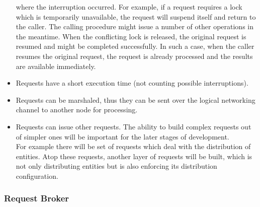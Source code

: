 \documentclass[a4paper, 10pt]{book}
\begin{document}
\begin{itemize}
                                        where the interruption occurred.
                                        For example, if a request requires a lock which is temporarily
                                        unavailable, the request will suspend itself and return to the
                                        caller. The calling procedure might issue a number of other
                                        operations in the meantime. When the conflicting lock is released,
                                        the original request is resumed and might be completed
                                        successfully. 
                                        In such a case, when the caller resumes the original request, the
                                        request is already processed and the results are available
                                        immediately. 
                                    \item Requests have a short execution time (not counting possible
                                        interruptions). 
                                    \item Requests can be marshaled, thus they can be sent over the
                                        logical networking channel to another node for processing. 
                                    \item Requests can issue other requests. The ability to build complex
                                        requests out of simpler ones will be important for the later stages
                                        of development.\\
                                        For example there will be set of requests which deal with the
                                        distribution of entities. Atop these requests, another layer of
                                        requests will be built, which is not only distributing entities but
                                        is also enforcing its distribution configuration.
                                \end{itemize}


                                \subsubsection{Request Broker}
\end{document}
